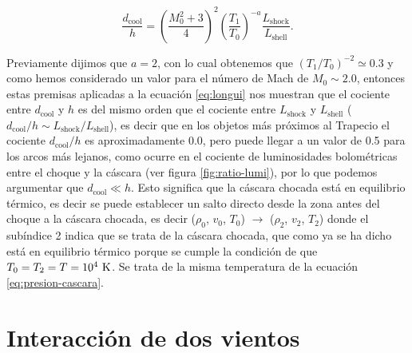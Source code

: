 \begin{equation}
\label{eq:longui}
 \frac{d_{\text{cool}}}{h} = \left(\frac{M^{2}_{0}+3}{4}\right)^{2} \left(\frac{T_{1}}{T_{0}}\right)^{-a} \frac{L_{\text{shock}}}{L_{\text{shell}}}.
\end{equation}

Previamente dijimos que \(a = 2\), con lo cual obtenemos que \((T_{1}/T_{0})^{-2} \simeq 0.3\) y como hemos considerado un valor para el número de Mach de \(M_{0}\sim 2.0\), entonces estas premisas aplicadas a la ecuación \ref{eq:longui} nos muestran que el cociente entre \(d_{\text{cool}}\) y \(h\) es del mismo orden que el cociente entre \(L_{\text{shock}}\) y \(L_{\text{shell}}\) (\(d_{\text{cool}}/h \sim L_{\text{shock}}/L_{\text{shell}}\)), es decir que en los objetos más próximos al Trapecio el cociente \(d_{\text{cool}} / h\) es aproximadamente 0.0, pero  puede llegar a un valor de 0.5 para los arcos más lejanos, como ocurre en el cociente de luminosidades bolométricas entre el choque y la cáscara (ver figura \ref{fig:ratio-lumi}), por lo que podemos argumentar que \(d_{\text{cool}} \ll h\). Esto significa que la cáscara chocada está en equilibrio térmico, es decir se puede establecer un salto directo desde la zona antes del choque a la cáscara chocada, es decir (\(\rho_{0}\), \(v_{0}\), \(T_{0}\)) \(\rightarrow\) (\(\rho_{2}\), \(v_{2}\), \(T_{2}\)) donde el subíndice 2 indica que se trata de la cáscara chocada, que como ya se ha dicho está en equilibrio térmico porque se cumple la condición de que \(T_{0} = T_{2} = T = 10^{4}~\mathrm{K}\). Se trata de la misma temperatura de la ecuación \ref{eq:presion-cascara}. \\  

\section{Interacción de dos vientos}
\label{sec:interaction}

